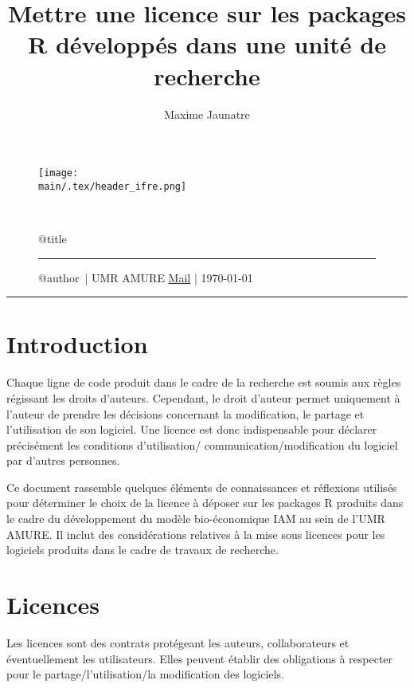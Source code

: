 \documentclass[12pt, colorinlistoftodos]{article}
\title{Mettre une licence sur les packages R développés dans une unité de recherche}
\author{Maxime Jaunatre}
\providecommand{\main}{.}  %
\begin{document}
\thispagestyle{plain}

\begin{figure}
    \texttt{[image: \\main/.tex/header\_ifre.png]}
    \par ~ \par
    \begin{minipage}{\textwidth}
        \begin{center}
            {\huge \csname @title\endcsname }
        \end{center}
        \rule{7em}{.4pt}\par
        \csname @author\endcsname ~| UMR AMURE \hfill %
        \href{mailto:maxime.jaunatre@ifremer.fr}{Mail} | \today
    \end{minipage}
\end{figure}
\hrule

\section{Introduction}

Chaque ligne de code produit dans le cadre de la recherche est soumis aux règles régissant les droits d'auteurs. 
Cependant, le droit d'auteur permet uniquement à l'auteur de prendre les décisions concernant la modification, le partage et l'utilisation de son logiciel.
Une licence est donc indispensable pour déclarer précisément les conditions d'utilisation/ communication/modification du logiciel par d'autres personnes.

Ce document rassemble quelques éléments de connaissances et réflexions utilisés pour déterminer le choix de la licence 
à déposer sur les packages R produits dans le cadre du développement du modèle bio-économique IAM au sein de l'UMR AMURE. 
Il inclut des considérations relatives à la mise sous licences pour les logiciels produits dans le cadre de travaux de recherche.

\section{Licences}

Les licences sont des contrats protégeant les auteurs, collaborateurs et éventuellement les utilisateurs.
Elles peuvent établir des obligations à respecter pour le partage/l'utilisation/la modification des logiciels.
\end{document}
